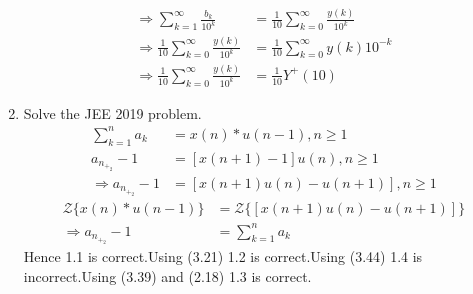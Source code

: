\documentclass[journal,12pt,twocolumn]{IEEEtran}
\renewcommand\thesection{\arabic{section}}
\begin{document}
\begin{enumerate}[label=\thesection.\arabic*,ref=\thesection.\theenumi]
\begin{align}
	\Rightarrow \sum_{k=1}^{\infty}\frac{b_k}{10^{k}}&=\frac{1}{10}\sum_{k=0}^{\infty}\frac{y(k)}{10^{k}}\\
	\Rightarrow \frac{1}{10}\sum_{k=0}^{\infty}\frac{y(k)}{10^{k}}&=\frac{1}{10}\sum_{k=0}^{\infty}y(k)10^{-k}\\
	\Rightarrow \frac{1}{10}\sum_{k=0}^{\infty}\frac{y(k)}{10^{k}}&=\frac{1}{10}Y^{+}(10)
\end{align}
\item Solve the JEE 2019 problem.\\
\solution
\begin{align}
	\sum_{k=1}^{n}a_k&=x(n)*u(n-1),n \ge 1\\
	a_n_+_2-1&=[x(n+1)-1]u(n),n \ge 1\\
	\Rightarrow a_n_+_2-1&=[x(n+1)u(n)-u(n+1)],n \ge 1
\end{align}
\begin{align}
	{\mathcal {Z}}\{x(n)*u(n-1)\}&={\mathcal {Z}}\{[x(n+1)u(n)-u(n+1)]\}\\
	\Rightarrow a_n_+_2-1&=\sum_{k=1}^{n}a_k
\end{align}
Hence 1.1 is correct.Using (3.21) 1.2 is correct.Using (3.44) 1.4 is incorrect.Using (3.39) and (2.18) 1.3 is correct.
\end{enumerate}
\end{document}

